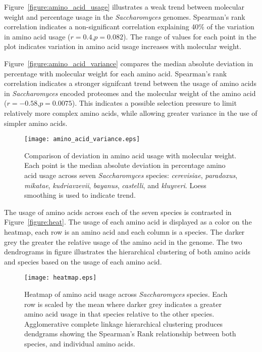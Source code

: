 Figure~\ref{figure:amino_acid_usage} illustrates a weak trend between molecular weight and percentage usage in the \emph{Saccharomyces} genomes. Spearman's rank correlation indicates a non-significant correlation explaining 40\% of the variation in amino acid usage ($r = 0.4$,$p = 0.082$). The range of values for each point in the plot indicates variation in amino acid usage increases with molecular weight.

Figure~\vref{figure:amino_acid_variance} compares the median absolute deviation in percentage with molecular weight for each amino acid. Spearman's rank correlation indicates a stronger signifcant trend between the usage of amino acids in \emph{Saccharomyces} encoded proteomes and the molecular weight of the amino acid ($r = - 0.58$,$p = 0.0075$). This indicates a possible selection pressure to limit relatively more complex amino acids, while allowing greater variance in the use of simpler amino acids.

\begin{figure}
  \centering
  \texttt{[image: amino\_acid\_variance.eps]}
  \caption[Comparison of deviation in amino acid usage with molecular weight]{Comparison of deviation in amino acid usage with molecular weight. Each point is the median absolute deviation in percentage amino acid usage across seven \emph{Saccharomyces} species: \emph{cerevisiae}, \emph{paradoxus}, \emph{mikatae}, \emph{kudriavzevii}, \emph{bayanus}, \emph{castelli}, and \emph{kluyveri}. Loess smoothing is used to indicate trend.}
  \label{figure:amino_acid_variance}
\end{figure}

The usage of amino acids across each of the seven species is contrasted in Figure~\vref{figure:heat}. The usage of each amino acid is displayed as a color on the heatmap, each row is an amino acid and each column is a species. The darker grey the greater the relative usage of the amino acid in the genome. The two dendrograms in figure illustrates the hierarchical clustering of both amino acids and species based on the usage of each amino acid.

\begin{figure}
  \centering
  \texttt{[image: heatmap.eps]}
  \caption[Heatmap of amino acid usage across \emph{Saccharomyces} species]{Heatmap of amino acid usage across \emph{Saccharomyces} species. Each row is scaled by the mean where darker grey indicates a greater amino acid usage in that species relative to the other species. Agglomerative complete linkage hierarchical clustering produces dendgrams showing the Spearman's Rank relationship between both species, and individual amino acids.}
  \label{figure:heat}
\end{figure}

